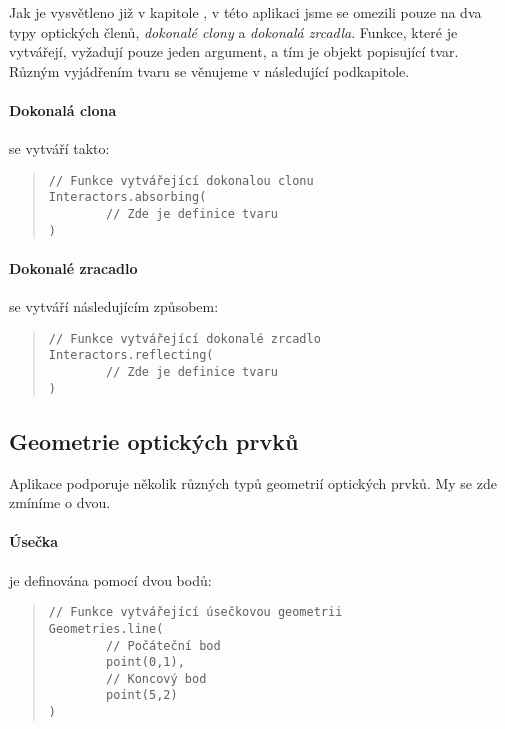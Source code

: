 Jak je vysvětleno již v kapitole , v této aplikaci jsme se omezili pouze na dva typy optických členů, \emph{dokonalé clony} a \emph{dokonalá zrcadla}. Funkce, které je vytvářejí, vyžadují pouze jeden argument, a tím je objekt popisující tvar. Různým vyjádřením tvaru se věnujeme v následující podkapitole.

\paragraph{Dokonalá clona} se vytváří takto:

\begin{minipage}{\textwidth}\begin{quote}\begin{lstlisting}
// Funkce vytvářející dokonalou clonu
Interactors.absorbing(
        // Zde je definice tvaru
)
\end{lstlisting}\end{quote}\end{minipage}
    

\paragraph{Dokonalé zracadlo} se vytváří následujícím způsobem:

\begin{minipage}{\textwidth}\begin{quote}\begin{lstlisting}
// Funkce vytvářející dokonalé zrcadlo
Interactors.reflecting(
        // Zde je definice tvaru
)
\end{lstlisting}\end{quote}\end{minipage}


\subsection{Geometrie optických prvků}

Aplikace podporuje několik různých typů geometrií optických prvků. My se zde zmíníme o dvou.

\paragraph{Úsečka} je definována pomocí dvou bodů:

\begin{minipage}{\textwidth}\begin{quote}\begin{lstlisting}
// Funkce vytvářející úsečkovou geometrii
Geometries.line(
        // Počáteční bod
        point(0,1),
        // Koncový bod
        point(5,2)
)
\end{lstlisting}\end{quote}\end{minipage}

